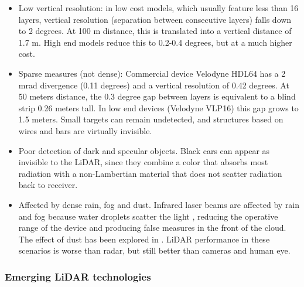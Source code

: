 \begin{itemize}    
    \item Low vertical resolution: in low cost models, which usually feature 
    less than 16 layers, vertical resolution (separation between consecutive
    layers) falls down to 2 degrees. At 100 m distance, this is translated into 
    a vertical distance of 1.7 m. High end models reduce this to 0.2-0.4 
    degrees, but at a much higher cost.
    
    \item Sparse measures (not dense): 
    Commercial device Velodyne HDL64 has a 2 mrad divergence \cite{Glennie2010} 
    (0.11 degrees) and a vertical resolution of 0.42 degrees. At 50 meters 
    distance, the 0.3 degree gap between layers is equivalent to a blind strip
    0.26 meters tall. In low end devices (Velodyne VLP16) this gap grows to 1.5
    meters. Small targets can remain undetected, and structures based on
    wires and bars are virtually invisible.
    
    \item Poor detection of dark and specular objects. Black cars
    can appear as invisible to the LiDAR, since they combine a color that
    absorbs most radiation with a non-Lambertian material that does not scatter
    radiation back to receiver.
    
    
    \item Affected by dense rain, fog and dust. Infrared laser
    beams are affected by rain and fog because water droplets scatter the light 
    \cite{Wang2008}, reducing the operative range of the device and producing 
    false measures in the front of the cloud. The effect of dust has been
    explored in \cite{Phillips2017}. LiDAR performance in these scenarios is 
    worse than radar, but still better than cameras and human eye.
\end{itemize}

\subsubsection{Emerging LiDAR technologies}
\label{sec:03-lidar-emerging}


